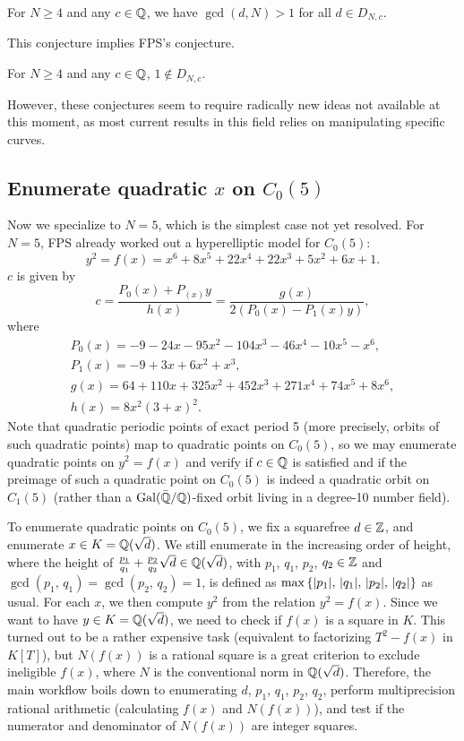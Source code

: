 \begin{conjecture}
  For $N \ge 4$ and any $c \in \mathbb{Q}$, we have $\gcd(d, N) > 1$ for all
  $d \in D_{N,c}$.
\end{conjecture}

This conjecture implies FPS's conjecture.

\begin{conjecture}[FPS]
  For $N \ge 4$ and any $c \in \mathbb{Q}$, $1 \not\in D_{N,c}$.
\end{conjecture}

However, these conjectures seem to require radically new ideas not
available at this moment, as most current results in this field relies
on manipulating specific curves.

\subsection{Enumerate quadratic $x$ on $C_0(5)$}

Now we specialize to $N = 5$, which is the simplest case not yet
resolved. For $N = 5$, FPS already worked out a hyperelliptic model
for $C_0(5)$:
\[
y^2 = f(x) = x^6 + 8x^5 + 22x^4 + 22x^3 + 5x^2 + 6x + 1.
\]
$c$ is given by
\[
c = \frac{P_0(x) + P_(x) y}{h(x)} = \frac{g(x)}{2(P_0(x) - P_1(x) y)},
\]
where
\[
\begin{gathered}
  P_0(x) = - 9 - 24x - 95x^2 - 104x^3 - 46x^4 - 10x^5 - x^6,\\
  P_1(x) = - 9 + 3x + 6x^2 + x^3,\\
  g(x) = 64 + 110x + 325x^2 + 452x^3 + 271x^4 + 74x^5 + 8x^6,\\
  h(x) = 8x^2(3 + x)^2.
\end{gathered}
\]
Note that quadratic periodic points of exact period 5 (more precisely,
orbits of such quadratic points) map to quadratic points on $C_0(5)$,
so we may enumerate quadratic points on $y^2 = f(x)$ and verify if $c
\in \mathbb{Q}$ is satisfied and if the preimage of such a quadratic point on
$C_0(5)$ is indeed a quadratic orbit on $C_1(5)$ (rather than a
$\mathrm{Gal}(\bar{\mathbb{Q}}/\mathbb{Q})$-fixed orbit living in a degree-10 number field).

To enumerate quadratic points on $C_0(5)$, we fix a squarefree $d \in
\mathbb{Z}$, and enumerate $x \in K = \mathbb{Q}(\sqrt{d})$. We still enumerate in the
increasing order of height, where the height of $\frac{p_1}{q_1} +
\frac{p_2}{q_2} \sqrt{d} \in \mathbb{Q}(\sqrt{d})$, with $p_1$, $q_1$, $p_2$,
$q_2 \in \mathbb{Z}$ and $\gcd(p_1,\, q_1) = \gcd(p_2,\, q_2) = 1$, is defined
as $\max\left\{|p_1|,\, |q_1|,\, |p_2|,\, |q_2|\right\}$ as usual. For each
$x$, we then compute $y^2$ from the relation $y^2 = f(x)$. Since we
want to have $y \in K = \mathbb{Q}(\sqrt{d})$, we need to check if $f(x)$ is a
square in $K$. This turned out to be a rather expensive task
(equivalent to factorizing $T^2 - f(x)$ in $K[T]$), but $N(f(x))$ is a
rational square is a great criterion to exclude ineligible $f(x)$,
where $N$ is the conventional norm in $\mathbb{Q}(\sqrt{d})$. Therefore, the
main workflow boils down to enumerating $d$, $p_1$, $q_1$, $p_2$,
$q_2$, perform multiprecision rational arithmetic (calculating $f(x)$
and $N(f(x))$), and test if the numerator and denominator of $N(f(x))$
are integer squares.

